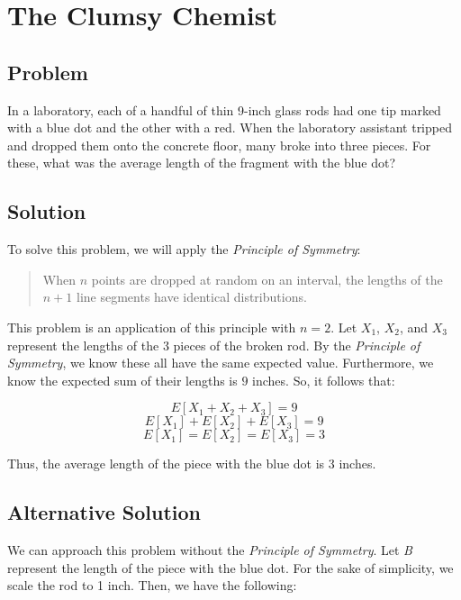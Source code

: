 \documentclass{article}
\date{}
\author{Kaan Aksoy | March 10, 2020}
\begin{document}
\maketitle
\section{The Clumsy Chemist}
\subsection{Problem}
In a laboratory, each of a handful of thin 9-inch glass rods had one tip marked with a blue dot and the other with a red.  When the laboratory assistant tripped and dropped them onto the concrete floor, many broke into three pieces. For these, what was the average length of the fragment with the blue dot?

\subsection{Solution}

To solve this problem, we will apply the \textit{Principle of Symmetry}: 

\begin{quote}
When $n$ points are dropped at random on an interval, the 
lengths of the $n + 1$ line segments have identical distributions.
\end{quote}

\vspace{0.3cm}

This problem is an application of this principle with $n = 2$. Let  
$X_1$, $X_2$, and $X_3$ represent the lengths of the $3$ pieces of the 
broken rod. By the \textit{Principle of Symmetry}, we know these all have 
the same expected value. Furthermore, we know the expected sum of their 
lengths is $9$ inches. So, it follows that:

$$E[X_1+X_2+X_3] = 9$$
$$E[X_1] + E[X_2] + E[X_3]= 9$$
$$E[X_1] = E[X_2] = E[X_3]= 3$$

Thus, the average length of the piece with the blue dot is $3$ inches.

\subsection{Alternative Solution}

We can approach this problem without the \textit{Principle of Symmetry}. 
Let \textit{B} represent the length of the piece with the blue dot. For 
the sake of simplicity, we scale the rod to 1 inch. Then, we have 
the following:
\end{document}
